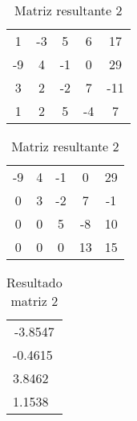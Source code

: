 \documentclass[12pt]{article}
\begin{document}
\begin{table}[htb]
  \begin{minipage}[b]{.46\linewidth}

    \centering
    \begin{tabular}{|c c c c|c|}
        1           &         -3          &           5     &   6     &   17\\
        -9          &         4           &          -1     &   0     &   29\\
        3           &         2           &          -2     &   7     &   -11\\
        1           &         2           &           5     &   -4    &   7\\
    \end{tabular}
    \caption{Matriz de entrada 2}
    \label{tab:esq}

  \end{minipage}\hfill
  \begin{minipage}[b]{.46\linewidth}

    \centering
    \begin{tabular}{|c c c c|c|}
        -9           &         4          &           -1     &   0     &   29\\
        0          &         3           &          -2     &   7     &   -1\\
        0           &         0           &          5     &   -8     &   10\\
        0           &         0           &           0     &   13    &   15\\
    \end{tabular}
    \caption{Matriz resultante 2}
    \label{tab:dir}
  \end{minipage}
\end{table}


\begin{table}[!h]
\centering
\begin{tabular}{|l|}
\multicolumn{1}{|c|}{-3.8547} \\
-0.4615                         \\
3.8462                        \\
1.1538
\end{tabular}
\caption{Resultado matriz 2}
\end{table}
\end{document}
